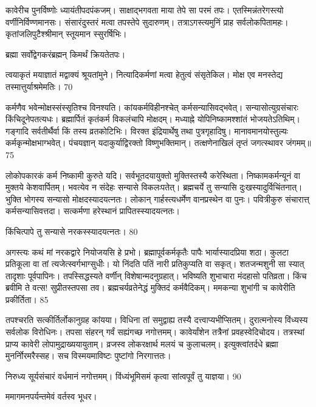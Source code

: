 कावेरीच पुनर्विष्णोः ध्यायंतीपदपंकजम्।
साक्षाद्भगवता माया तेपे सा परमं तपः।
एतस्मिन्नंतरेगस्त्यो वर्णीनिर्विण्णमानसः।
संसारंदुस्तरं मत्वा तपस्तेपे सुदारुणम्।
तत्राऽगस्त्यमुनिं प्राह सर्वलोकपितामहः।
कृतांजलिपुटैश्श्रीमान् स्तूयमान स्सुरर्षिभिः।

ब्रह्मा
सर्वोद्वेगकरंब्रह्मन् किमर्थं क्रियतेतपः।

त्वयाकृतं मयाज्ञातं मद्वाक्यं श्रूयतांमुने।
नित्यादिकर्मणां मत्वा हेतुत्वं संसृतेकिल।
मोक्ष एव मनस्तेद्य तस्मात्तुर्याश्रमेमतिः।
70

कर्मणैव भवेन्मोक्षस्संस्सृतिश्च विनश्यति।
कांयकर्मविहीनश्चेत् कर्मसन्यासिवद्भवेत्।
सन्यासोत्युग्रसंचारः किंचिदूनेपतत्यधः।
ब्रह्मार्पितं कृतंकर्म विकलंचापि मोक्षदम्।
मध्याह्ने योपिनिष्कामश्शांतं भोजयतेऽतिथिम्।
गङ्गादि सर्वतीर्थैर्वा किं तस्य व्रतकोटिभिः।
विरक्त इंद्रियार्थेषु तथा पुत्रगृहादिषु।
मानावमानयोस्तुल्यः कर्मकृन्मोक्षभाग्भवेत्।
पंचयज्ञान् यदाकुर्याद्विरक्तो विष्णुभक्तिमान्।
तत्क्षणेनाखिलं तृप्तं जगत्स्थावर जंगमम्॥75

लोकोपकारकं कर्म निष्कामी कुरुते यदि।
सर्वभूतदयायुक्तो मुक्तिस्तस्यै करेस्थिता।
निष्कामकर्मन्यूनं वा मुक्तये केशवार्पितम्।
भवत्येव न संदेहः सन्यासे विकलःपतेत्।
ब्रह्मचर्ये तु सन्यासि दुःखस्यादुर्विचिंतनात्।
भुक्ति भोगस्य सन्यासो मोक्षदस्यादयत्नतः।
लोकान् गार्हस्त्यधर्मेण वानप्रस्थेन वा पुनः।
पवित्रीकुरु संचारात्त् कर्मसन्यासिवत्तदा।
सत्कर्मणा हरेस्थानं प्रापितस्स्यादयत्नतः।

किंचित्पापे तु सन्यासे नरकस्स्यादयत्नतः।
80


अगस्त्यः
कथं मां नरकद्वारे नियोजयसि हे प्रभो।
ब्रह्मापूर्वकर्मकृतैः पापैः भार्यास्यादप्रिया शठा।
कुलटा प्रतिकूला वा तां त्यजेत्स्वर्गभाग्सुधीः।
यो निंदति पतिं नारी प्रतिकुप्यति वा सकृत्।
शतजन्मशुनी सा स्यात् तादृशाः पूर्वपापिनः।
तपस्सिद्धस्यते वर्णीन् विशेषान्मदनुग्रहात्।
भविष्यति शुभाचारा मंदहासो पतिव्रता।
किंच ब्रवीमि ते वत्स! सुप्रीतस्तपसा तव।
ब्रह्मचर्यव्रतेनेद्धं मुक्तिदं कर्मवैदिकम्।
ममकन्या शुभांगी च कावेरीति प्रकीर्तिता।
85

तपश्चरति सत्कीर्तिर्लोकानुग्रह कांयया।
विधिना तां समुद्वाह्य तस्यै दत्त्वाप्यभीप्सितम्।
दुरात्मनोस्य विंध्यस्य सर्वलोक विरोधिनः।
तपसा संहरन् गर्वं सह्यंगच्छ नगोत्तमम्।
कावेर्यांशेन तत्रैनां प्रवहस्वेदिचोदय।
तत्रस्थां प्राप्य कावेरी लोपामुद्राख्ययायुताम्।
व्रजस्व लोकरक्षार्थ मलयं च कुलाचलम्।
इत्युक्त्वांतर्दधे ब्रह्मा मुनर्नोिरमरैस्सह।
सच विस्मयमाविष्टः पुष्टांगो निरगात्ततः।

निरुध्य सूर्यसंचारं वर्धमानं नगोत्तमम्।
विंध्यंभूमिसमं कृत्वा सांत्वपूर्वं तु याज्ञया।
90

ममागमनपर्यन्तमेवं वर्तस्व भूधर।


